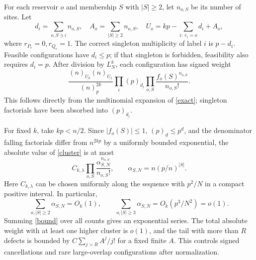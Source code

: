 \documentclass[11pt]{article}
\newcommand{\fall}[2]{(#1)_{\underline{#2}}}
\begin{document}
For each reservoir $o$ and membership $S$ with $|S|\ge2$, let
$n_{o,S}$ be its number of sites. Let
\begin{equation}
 d_i=\sum_{o,S\ni i}n_{o,S},\quad
 A_o=\sum_{|S|\ge2}n_{o,S},\quad
 U_o=kp-\sum_{i:\ r_i=o}d_i+A_o,
\end{equation}
where $r_{P_e}=0,r_{Q_e}=1$. The correct singleton multiplicity
of label $i$ is $p-d_i$. Feasible configurations have $d_i\le p$;
if that singleton is forbidden, feasibility also requires $d_i=p$.
After division by $L_N^k$, each configuration has signed weight
\begin{equation}\label{cluster}
 \frac{\fall n{U_0}\fall n{U_1}}{\fall np^{2k}}
 \prod_i\fall p{d_i}
 \prod_{o,S}\frac{f_o(S)^{n_{o,S}}}{n_{o,S}!}.
\end{equation}
This follows directly from the multinomial expansion of
\eqref{exact}; singleton factorials have been absorbed into
$\fall p{d_i}$.

For fixed $k$, take $kp<n/2$. Since $|f_o(S)|\le1$,
$\fall p d\le p^d$, and the denominator falling factorials
differ from $n^{2kp}$ by a uniformly bounded exponential,
the absolute value of \eqref{cluster} is at most
\begin{equation}\label{bound}
 C_{k,\lambda}\prod_{o,S}
 \frac{\alpha_{S,N}^{n_{o,S}}}{n_{o,S}!},\qquad
 \alpha_{S,N}=n(p/n)^{|S|}.
\end{equation}
Here $C_{k,\lambda}$ can be chosen uniformly along the sequence
with $p^2/N$ in a compact positive interval. In particular,
\begin{equation}
 \sum_{o,|S|\ge2}\alpha_{S,N}=O_k(1),\qquad
 \sum_{o,|S|\ge3}\alpha_{S,N}=O_k(p^3/N^2)=o(1).
\end{equation}
Summing \eqref{bound} over all counts gives an exponential series.
The total absolute weight with at least one higher cluster is
$o(1)$, and the tail with more than $R$ defects is bounded by
$C\sum_{j>R}A^j/j!$ for a fixed finite $A$. This controls signed
cancellations and rare large-overlap configurations after normalization.

\newpage
\end{document}
